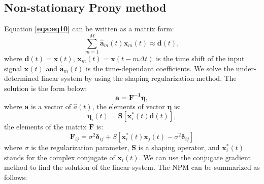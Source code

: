 \subsection{Non-stationary Prony method}
Equation \textbf{\ref{eqa:eq10}} can be written as a matrix form:
\begin{equation}
    \label{eqa:eq19}
    \sum_{m=1}^{M}\mathbf{\hat{a}}_m(t)\mathbf{x}_m(t) \approx \mathbf{d}(t),
\end{equation}
where $\mathbf{d}(t) = \mathbf{x}(t)$, $\mathbf{x}_m(t) = \mathbf{x}(t-m\Delta t)$ is the time shift
of the input signal $\mathbf{x}(t)$ and $\mathbf{\hat{a}}_m(t)$ is the time-dependant coefficients.
We solve the under-determined linear system by using the shaping regularization method.
The solution is the form below:
\begin{equation}
    \label{eqa:eq20}
    \mathbf{a = F^{-1}\eta},
\end{equation}
where $\mathbf{a}$ is a vector of $\hat{a}(t)$, the elements of vector $\mathbf{\eta}$ is:
\begin{equation}
    \label{eqa:eq21}
    \mathbf{\eta}_i(t) = \mathbf{S}\left[\mathbf{x}_i^*(t)\mathbf{d}(t)\right],
\end{equation}
the elements of the matrix $\mathbf{F}$ is:
\begin{equation}
    \label{eqa:eq22}
    \mathbf{F}_{ij}= \sigma^2 \mathbf{\delta}_{ij} + S[\mathbf{x}_i^*(t)\mathbf{x}_j(t) - \sigma^2 \mathbf{\delta}_{ij}]
\end{equation}
where $\sigma$ is the regularization parameter, $\mathbf{S}$ is a shaping operator,
and $\mathbf{x}_i^*(t)$ stands for the complex conjugate of $\mathbf{x}_i(t)$.
We can use the conjugate gradient method to find the solution of the linear system.
The NPM \cite[]{fomel2013} can be summarized as follows:


